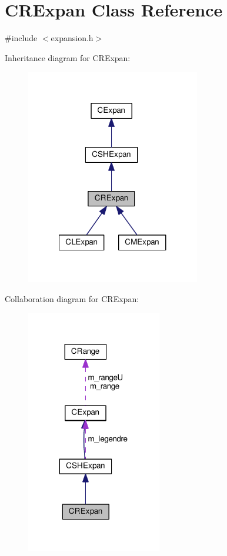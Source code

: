 \hypertarget{classCRExpan}{\section{C\-R\-Expan Class Reference}
\label{classCRExpan}
}


{\ttfamily \#include $<$expansion.\-h$>$}



Inheritance diagram for C\-R\-Expan\-:\nopagebreak
\begin{figure}[H]
\begin{center}
\leavevmode
\includegraphics[width=215pt]{classCRExpan__inherit__graph}
\end{center}
\end{figure}


Collaboration diagram for C\-R\-Expan\-:\nopagebreak
\begin{figure}[H]
\begin{center}
\leavevmode
\includegraphics[width=167pt]{classCRExpan__coll__graph}
\end{center}
\end{figure}
